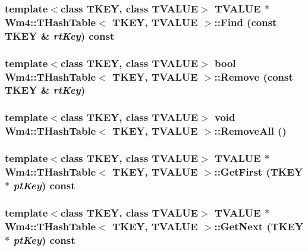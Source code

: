 \subsubsection{\setlength{\rightskip}{0pt plus 5cm}template$<$class TKEY, class TVALUE$>$ TVALUE $\ast$ {\bf Wm4::THash\-Table}$<$ TKEY, TVALUE $>$::Find (const TKEY \& {\em rt\-Key}) const}\label{classWm4_1_1THashTable_4808a6bab88e7de28b3d6d2544a7cc4e}


\subsubsection{\setlength{\rightskip}{0pt plus 5cm}template$<$class TKEY, class TVALUE$>$ bool {\bf Wm4::THash\-Table}$<$ TKEY, TVALUE $>$::Remove (const TKEY \& {\em rt\-Key})}\label{classWm4_1_1THashTable_28d65bfd9a9b47f21b4fe756f35c626f}


\subsubsection{\setlength{\rightskip}{0pt plus 5cm}template$<$class TKEY, class TVALUE$>$ void {\bf Wm4::THash\-Table}$<$ TKEY, TVALUE $>$::Remove\-All ()}\label{classWm4_1_1THashTable_8feedf143991fe1335205714ed88cdbf}


\subsubsection{\setlength{\rightskip}{0pt plus 5cm}template$<$class TKEY, class TVALUE$>$ TVALUE $\ast$ {\bf Wm4::THash\-Table}$<$ TKEY, TVALUE $>$::Get\-First (TKEY $\ast$ {\em pt\-Key}) const}\label{classWm4_1_1THashTable_5fe79643bf8f360877a3dc0347791694}


\subsubsection{\setlength{\rightskip}{0pt plus 5cm}template$<$class TKEY, class TVALUE$>$ TVALUE $\ast$ {\bf Wm4::THash\-Table}$<$ TKEY, TVALUE $>$::Get\-Next (TKEY $\ast$ {\em pt\-Key}) const}\label{classWm4_1_1THashTable_1a8a201de9f85ef2dd1f3b732e68231e}




